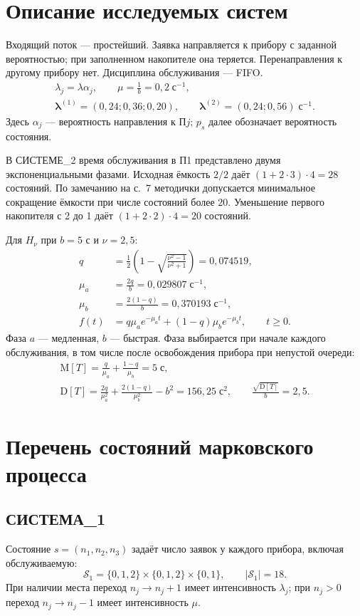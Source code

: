 \documentclass[12pt,a4paper]{article}
\begin{document}
\section{Описание исследуемых систем}
Входящий поток --- простейший. Заявка направляется к прибору с заданной вероятностью; при заполненном накопителе она теряется. Перенаправления к другому прибору нет. Дисциплина обслуживания --- FIFO.
\begin{gather}
\lambda_j=\lambda\alpha_j,\qquad \mu=\frac1b=0{,}2\;\text{с}^{-1},\\
\boldsymbol\lambda^{(1)}=(0{,}24;0{,}36;0{,}20),\qquad
\boldsymbol\lambda^{(2)}=(0{,}24;0{,}56)\;\text{с}^{-1}.
\end{gather}
Здесь $\alpha_j$ --- вероятность направления к П$j$; $p_s$ далее обозначает вероятность состояния.

В СИСТЕМЕ\_2 время обслуживания в П1 представлено двумя экспоненциальными фазами. Исходная ёмкость $2/2$ даёт $(1+2\cdot3)\cdot4=28$ состояний. По замечанию на с.~7 методички допускается минимальное сокращение ёмкости при числе состояний более 20. Уменьшение первого накопителя с 2 до 1 даёт $(1+2\cdot2)\cdot4=20$ состояний.
\newpage

Для $H_{\nu}$ при $b=5$ с и $\nu=2{,}5$:
\begin{align}
q&=\frac12\left(1-\sqrt{\frac{\nu^2-1}{\nu^2+1}}\right)=0{,}074519,\\
\mu_a&=\frac{2q}{b}=0{,}029807\;\text{с}^{-1},\\
\mu_b&=\frac{2(1-q)}{b}=0{,}370193\;\text{с}^{-1},\\
f(t)&=q\mu_ae^{-\mu_at}+(1-q)\mu_be^{-\mu_bt},\qquad t\geq0.
\end{align}
Фаза $a$ --- медленная, $b$ --- быстрая. Фаза выбирается при начале каждого обслуживания, в том числе после освобождения прибора при непустой очереди:
\begin{gather}
\mathrm M[T]=\frac q{\mu_a}+\frac{1-q}{\mu_b}=5\;\text{с},\\
\mathrm D[T]=\frac{2q}{\mu_a^2}+\frac{2(1-q)}{\mu_b^2}-b^2=156{,}25\;\text{с}^2,\qquad
\frac{\sqrt{\mathrm D[T]}}b=2{,}5.
\end{gather}

\section{Перечень состояний марковского процесса}
\subsection{СИСТЕМА\_1}
Состояние $s=(n_1,n_2,n_3)$ задаёт число заявок у каждого прибора, включая обслуживаемую:
\begin{equation}
\mathcal S_1=\{0,1,2\}\times\{0,1,2\}\times\{0,1\},\qquad |\mathcal S_1|=18.
\end{equation}
При наличии места переход $n_j\to n_j+1$ имеет интенсивность $\lambda_j$; при $n_j>0$ переход $n_j\to n_j-1$ имеет интенсивность $\mu$.
\end{document}
